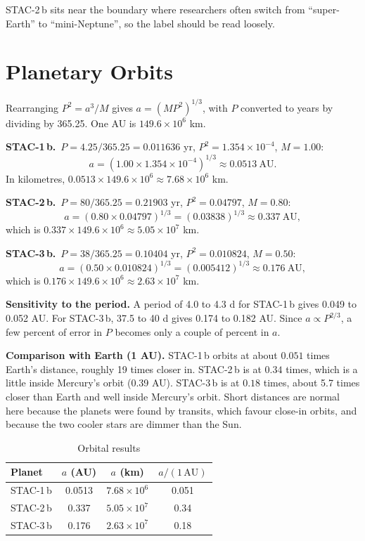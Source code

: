 \documentclass[10pt,twocolumn]{article}
\begin{document}
STAC-2\,b sits near the boundary where researchers often switch from ``super-Earth'' to ``mini-Neptune'', so the label should be read loosely.

\section{Planetary Orbits}
Rearranging $P^2=a^3/M$ gives $a=(M P^2)^{1/3}$, with $P$ converted to years by dividing by 365.25. One AU is $149.6\times10^6$ km.

\textbf{STAC-1\,b.}\ $P=4.25/365.25=0.011636$ yr, $P^2=1.354\times10^{-4}$, $M=1.00$:
\begin{equation}
a=(1.00\times1.354\times10^{-4})^{1/3}\approx0.0513\ \text{AU}.
\end{equation}
In kilometres, $0.0513\times149.6\times10^6\approx7.68\times10^6$ km.

\textbf{STAC-2\,b.}\ $P=80/365.25=0.21903$ yr, $P^2=0.04797$, $M=0.80$:
\begin{equation}
a=(0.80\times0.04797)^{1/3}=(0.03838)^{1/3}\approx0.337\ \text{AU},
\end{equation}
which is $0.337\times149.6\times10^6\approx5.05\times10^7$ km.

\textbf{STAC-3\,b.}\ $P=38/365.25=0.10404$ yr, $P^2=0.010824$, $M=0.50$:
\begin{equation}
a=(0.50\times0.010824)^{1/3}=(0.005412)^{1/3}\approx0.176\ \text{AU},
\end{equation}
which is $0.176\times149.6\times10^6\approx2.63\times10^7$ km.

\textbf{Sensitivity to the period.} A period of 4.0 to 4.3 d for STAC-1\,b gives 0.049 to 0.052 AU. For STAC-3\,b, 37.5 to 40 d gives 0.174 to 0.182 AU. Since $a\propto P^{2/3}$, a few percent of error in $P$ becomes only a couple of percent in $a$.

\textbf{Comparison with Earth (1 AU).}
STAC-1\,b orbits at about $0.051$ times Earth's distance, roughly 19 times closer in. STAC-2\,b is at $0.34$ times, which is a little inside Mercury's orbit (0.39 AU). STAC-3\,b is at $0.18$ times, about 5.7 times closer than Earth and well inside Mercury's orbit. Short distances are normal here because the planets were found by transits, which favour close-in orbits, and because the two cooler stars are dimmer than the Sun.

\begin{table}[h]
\centering
\caption{Orbital results}
\small
\begin{tabular}{lccc}
\toprule
Planet & $a$ (AU) & $a$ (km) & $a/(1\,\text{AU})$\\
\midrule
STAC-1\,b & 0.0513 & $7.68\times10^6$ & 0.051\\
STAC-2\,b & 0.337 & $5.05\times10^7$ & 0.34\\
STAC-3\,b & 0.176 & $2.63\times10^7$ & 0.18\\
\bottomrule
\end{tabular}
\end{table}
\end{document}
